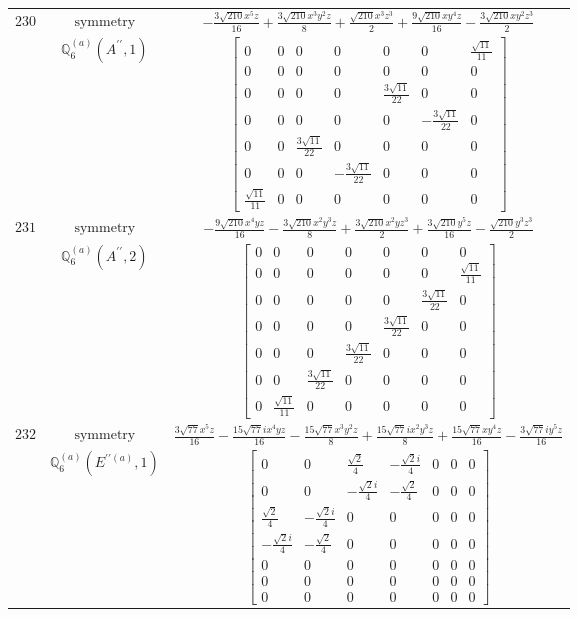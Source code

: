\documentclass[fleqn,8pt,landscape]{jsarticle}
\begin{document}
\begin{longtable}{ccc}
$ 230 $ & $ \text{symmetry} $ & $ - \frac{3 \sqrt{210} x^{5} z}{16} + \frac{3 \sqrt{210} x^{3} y^{2} z}{8} + \frac{\sqrt{210} x^{3} z^{3}}{2} + \frac{9 \sqrt{210} x y^{4} z}{16} - \frac{3 \sqrt{210} x y^{2} z^{3}}{2} $ \\
$  $ & $ \mathbb{Q}_{6}^{(a)}(A^{\prime\prime},1) $ & $ \begin{bmatrix} 0 & 0 & 0 & 0 & 0 & 0 & \frac{\sqrt{11}}{11} \\ 0 & 0 & 0 & 0 & 0 & 0 & 0 \\ 0 & 0 & 0 & 0 & \frac{3 \sqrt{11}}{22} & 0 & 0 \\ 0 & 0 & 0 & 0 & 0 & - \frac{3 \sqrt{11}}{22} & 0 \\ 0 & 0 & \frac{3 \sqrt{11}}{22} & 0 & 0 & 0 & 0 \\ 0 & 0 & 0 & - \frac{3 \sqrt{11}}{22} & 0 & 0 & 0 \\ \frac{\sqrt{11}}{11} & 0 & 0 & 0 & 0 & 0 & 0 \end{bmatrix} $ \\ \hline
$ 231 $ & $ \text{symmetry} $ & $ - \frac{9 \sqrt{210} x^{4} y z}{16} - \frac{3 \sqrt{210} x^{2} y^{3} z}{8} + \frac{3 \sqrt{210} x^{2} y z^{3}}{2} + \frac{3 \sqrt{210} y^{5} z}{16} - \frac{\sqrt{210} y^{3} z^{3}}{2} $ \\
$  $ & $ \mathbb{Q}_{6}^{(a)}(A^{\prime\prime},2) $ & $ \begin{bmatrix} 0 & 0 & 0 & 0 & 0 & 0 & 0 \\ 0 & 0 & 0 & 0 & 0 & 0 & \frac{\sqrt{11}}{11} \\ 0 & 0 & 0 & 0 & 0 & \frac{3 \sqrt{11}}{22} & 0 \\ 0 & 0 & 0 & 0 & \frac{3 \sqrt{11}}{22} & 0 & 0 \\ 0 & 0 & 0 & \frac{3 \sqrt{11}}{22} & 0 & 0 & 0 \\ 0 & 0 & \frac{3 \sqrt{11}}{22} & 0 & 0 & 0 & 0 \\ 0 & \frac{\sqrt{11}}{11} & 0 & 0 & 0 & 0 & 0 \end{bmatrix} $ \\ \hline
$ 232 $ & $ \text{symmetry} $ & $ \frac{3 \sqrt{77} x^{5} z}{16} - \frac{15 \sqrt{77} i x^{4} y z}{16} - \frac{15 \sqrt{77} x^{3} y^{2} z}{8} + \frac{15 \sqrt{77} i x^{2} y^{3} z}{8} + \frac{15 \sqrt{77} x y^{4} z}{16} - \frac{3 \sqrt{77} i y^{5} z}{16} $ \\
$  $ & $ \mathbb{Q}_{6}^{(a)}(E^{\prime\prime(a)},1) $ & $ \begin{bmatrix} 0 & 0 & \frac{\sqrt{2}}{4} & - \frac{\sqrt{2} i}{4} & 0 & 0 & 0 \\ 0 & 0 & - \frac{\sqrt{2} i}{4} & - \frac{\sqrt{2}}{4} & 0 & 0 & 0 \\ \frac{\sqrt{2}}{4} & - \frac{\sqrt{2} i}{4} & 0 & 0 & 0 & 0 & 0 \\ - \frac{\sqrt{2} i}{4} & - \frac{\sqrt{2}}{4} & 0 & 0 & 0 & 0 & 0 \\ 0 & 0 & 0 & 0 & 0 & 0 & 0 \\ 0 & 0 & 0 & 0 & 0 & 0 & 0 \\ 0 & 0 & 0 & 0 & 0 & 0 & 0 \end{bmatrix} $ \\ \hline

\end{longtable}
\end{document}

